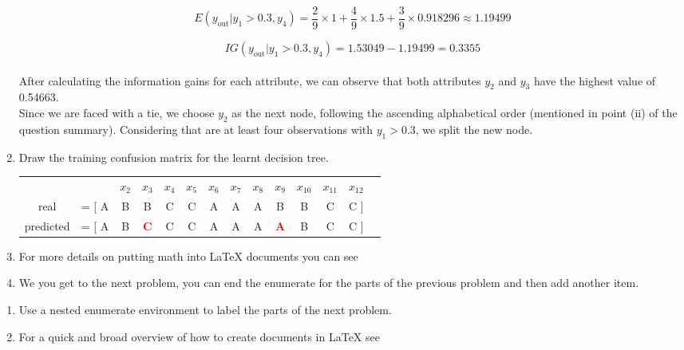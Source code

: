 \documentclass[12pt]{article}
\begin{document}
\begin{enumerate}[leftmargin=\labelsep]
\begin{equation*}
    E(y_{\text{out}}|y_1 > 0.3, y_4) = \frac{2}{9} \times 1 + \frac{4}{9} \times 1.5 + \frac{3}{9} \times 0.918296 \approx 1.19499
\end{equation*}

\begin{equation*}
    IG(y_{\text{out}} | y_1 > 0.3, y_4) = 1.53049 - 1.19499 = 0.3355
\end{equation*}
    
\paragraph{}

    After calculating the information gains for each attribute, we can observe that both attributes $y_2$ and $y_3$ have the highest value of 0.54663.\\
    Since we are faced with a tie, we choose $y_2$ as the next node, following the ascending alphabetical order (mentioned in point (ii) of the question summary).
    Considering that are at least four observations with $y_1 > 0.3$, we split the new node. 


\newpage

\item Draw the training confusion matrix for the learnt decision tree.
\begin{center}
    \begin{tabular}{cccccccccccccc}
        \multicolumn{2}{c}{}  $x_1$ & $x_2$ & $x_3$ & $x_4$ & $x_5$ & $x_6$ & $x_7$ & $x_8$ & $x_9$ & $x_{10}$ & $x_{11}$ & $x_{12}$ \\
        \multirow{1}{*}{real}      & =    [ A & B & B & C & C & A & A & A & B & B & C & C  ] \\
        \multirow{1}{*}{predicted} & =   [ A & B & \textcolor{red}{\textbf{C}} & C & C & A & A & A & \textcolor{red}{\textbf{A}} & B & C & C  ]
  \end{tabular}
\end{center}
    
\item For more details on putting math into {\LaTeX} documents you can see 

\item We you get to the next problem, you can end the enumerate for the parts of the previous problem and then add another item.
\end{enumerate}
\begin{enumerate}
    \item Use a nested enumerate environment to label the parts of the next problem.
    \item For a quick and broad overview of how to create documents in {\LaTeX} see 
\end{enumerate}
\end{document}
